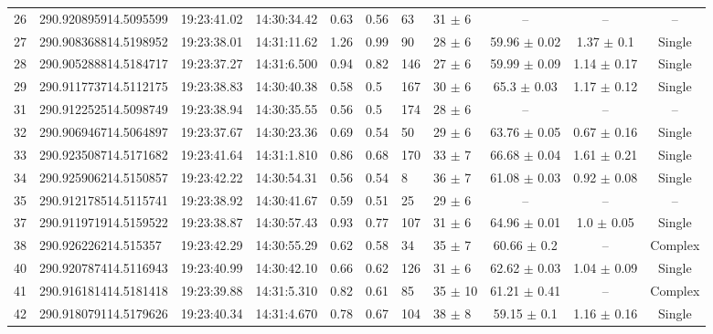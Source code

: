 \documentclass[longauth]{aa} %
\begin{document}
\begin{appendix}
\begin{table}[htbp!]
\begin{tabular}{llllllllccc}
26  &  290.920895914.5095599  &  19:23:41.02  &  14:30:34.42  &  0.63  &  0.56  &  63  &  31 $\pm$ 6  &  --  &  --  &  -- \\
27  &  290.908368814.5198952  &  19:23:38.01  &  14:31:11.62  &  1.26  &  0.99  &  90  &  28 $\pm$ 6  &  59.96 $\pm$ 0.02  &  1.37 $\pm$ 0.1  &  Single \\
28  &  290.905288814.5184717  &  19:23:37.27  &  14:31:6.500  &  0.94  &  0.82  &  146  &  27 $\pm$ 6  &  59.99 $\pm$ 0.09  &  1.14 $\pm$ 0.17  &  Single \\
29  &  290.911773714.5112175  &  19:23:38.83  &  14:30:40.38  &  0.58  &  0.5  &  167  &  30 $\pm$ 6  &  65.3 $\pm$ 0.03  &  1.17 $\pm$ 0.12  &  Single \\
31  &  290.912252514.5098749  &  19:23:38.94  &  14:30:35.55  &  0.56  &  0.5  &  174  &  28 $\pm$ 6  &  --  &  --  &  -- \\
32  &  290.906946714.5064897  &  19:23:37.67  &  14:30:23.36  &  0.69  &  0.54  &  50  &  29 $\pm$ 6  &  63.76 $\pm$ 0.05  &  0.67 $\pm$ 0.16  &  Single \\
33  &  290.923508714.5171682  &  19:23:41.64  &  14:31:1.810  &  0.86  &  0.68  &  170  &  33 $\pm$ 7  &  66.68 $\pm$ 0.04  &  1.61 $\pm$ 0.21  &  Single \\
34  &  290.925906214.5150857  &  19:23:42.22  &  14:30:54.31  &  0.56  &  0.54  &  8  &  36 $\pm$ 7  &  61.08 $\pm$ 0.03  &  0.92 $\pm$ 0.08  &  Single \\
35  &  290.912178514.5115741  &  19:23:38.92  &  14:30:41.67  &  0.59  &  0.51  &  25  &  29 $\pm$ 6  &  --  &  --  &  -- \\
37  &  290.911971914.5159522  &  19:23:38.87  &  14:30:57.43  &  0.93  &  0.77  &  107  &  31 $\pm$ 6  &  64.96 $\pm$ 0.01  &  1.0 $\pm$ 0.05  &  Single \\
38  &  290.926226214.515357  &  19:23:42.29  &  14:30:55.29  &  0.62  &  0.58  &  34  &  35 $\pm$ 7  &  60.66 $\pm$ 0.2  &  --  &  Complex \\
40  &  290.920787414.5116943  &  19:23:40.99  &  14:30:42.10  &  0.66  &  0.62  &  126  &  31 $\pm$ 6  &  62.62 $\pm$ 0.03  &  1.04 $\pm$ 0.09  &  Single \\
41  &  290.916181414.5181418  &  19:23:39.88  &  14:31:5.310  &  0.82  &  0.61  &  85  &  35 $\pm$ 10  &  61.21 $\pm$ 0.41  &  --  &  Complex \\
42  &  290.918079114.5179626  &  19:23:40.34  &  14:31:4.670  &  0.78  &  0.67  &  104  &  38 $\pm$ 8  &  59.15 $\pm$ 0.1  &  1.16 $\pm$ 0.16  &  Single \\

\end{tabular}
\end{table}
\end{appendix}
\end{document}
